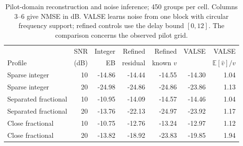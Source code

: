 \begin{table}[t]
\centering
\caption{Pilot-domain reconstruction and noise inference; 450 groups per cell. Columns 3--6 give NMSE in dB. VALSE learns noise from one block with circular frequency support; refined controls use the delay bound $[0,12]$. The comparison concerns the observed pilot grid.}
\label{tab:valse}
\small\setlength{\tabcolsep}{4pt}
\begin{tabular}{lrrrrrr}
\toprule
& SNR & Integer & Refined & Refined & VALSE & VALSE \\
Profile & (dB) & EB & residual & known $v$ & & $\mathbb E[\widehat v]/v$ \\
\midrule
Sparse integer & 10 & -14.86 & -14.44 & -14.55 & -14.30 & 1.04 \\
Sparse integer & 20 & -24.98 & -24.86 & -24.86 & -23.86 & 1.13 \\
Separated fractional & 10 & -10.95 & -14.09 & -14.57 & -14.46 & 1.04 \\
Separated fractional & 20 & -13.76 & -22.13 & -24.97 & -23.92 & 1.17 \\
Close fractional & 10 & -10.75 & -12.76 & -13.24 & -12.97 & 1.12 \\
Close fractional & 20 & -13.82 & -18.92 & -23.83 & -19.85 & 1.94 \\
\bottomrule
\end{tabular}
\end{table}